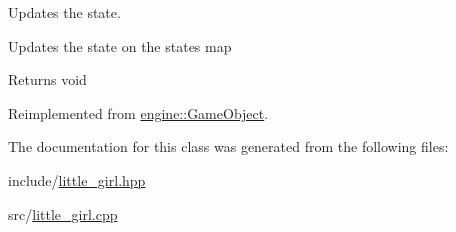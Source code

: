 Updates the state. 

Updates the state on the states map

\begin{DoxyReturn}{Returns}
void 
\end{DoxyReturn}


Reimplemented from \hyperlink{classengine_1_1_game_object}{engine\+::\+Game\+Object}.



The documentation for this class was generated from the following files\+:\begin{DoxyCompactItemize}
\item 
include/\hyperlink{little__girl_8hpp}{little\+\_\+girl.\+hpp}\item 
src/\hyperlink{little__girl_8cpp}{little\+\_\+girl.\+cpp}\end{DoxyCompactItemize}
